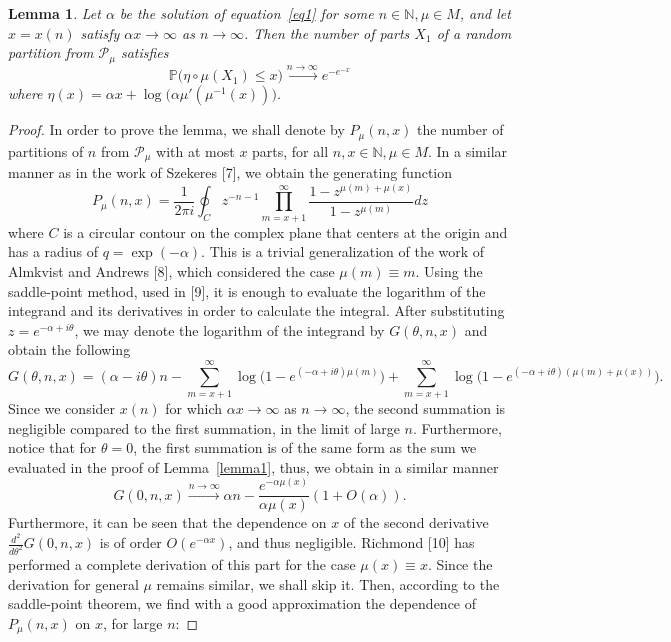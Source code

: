 \documentclass[pdflatex,sn-mathphys-num]{sn-jnl}%
\theoremstyle{thmstyleone}%
\theoremstyle{thmstyletwo}%
\theoremstyle{thmstylethree}%
\theoremstyle{thmstylethree}%
\newtheorem{lemma}{Lemma}%
\theoremstyle{thmstylethree}%
\begin{document}
\begin{lemma}\label{lemma2}
    Let $\alpha$ be the solution of equation~\eqref{eq1} for some $n\in\mathbb{N},\mu\in M$, and let $x=x(n)$ satisfy $\alpha x\to\infty$ as $n\to\infty$. Then the number of parts $X_1$ of a random partition from $\mathcal{P}_\mu$ satisfies
    \begin{equation}\label{eq3}
        \mathbb{P}(\eta\circ\mu(X_1)\le x\big)\xrightarrow{n\to\infty}e^{-e^{-x}}
    \end{equation}
    where $\eta(x)=\alpha x+\log\big(\alpha\mu'(\mu^{-1}(x))\big)$.
\end{lemma}
\begin{proof}
    In order to prove the lemma, we shall denote by $P_\mu(n,x)$ the number of partitions of $n$ from $\mathcal{P}_\mu$ with at most $x$ parts, for all $n,x\in\mathbb{N}, \mu\in M$. In a similar manner as in the work of Szekeres [7], we obtain the generating function
    \begin{equation}\label{eq4}
        P_\mu(n,x)=\frac{1}{2\pi i}\oint_Cz^{-n-1}\prod_{m=x+1}^\infty\frac{1-z^{\mu(m)+\mu(x)}}{1-z^{\mu(m)}}dz
    \end{equation}
    where $C$ is a circular contour on the complex plane that centers at the origin and has a radius of $q=\exp(-\alpha)$. This is a trivial generalization of the work of Almkvist and Andrews [8], which considered the case $\mu(m)\equiv m$. Using the saddle-point method, used in [9], it is enough to evaluate the logarithm of the integrand and its derivatives in order to calculate the integral. After substituting $z=e^{-\alpha+i\theta}$, we may denote the logarithm of the integrand by $G(\theta,n,x)$ and obtain the following
\begin{equation*}
    G(\theta,n,x)=(\alpha-i\theta)n-\sum_{m=x+1}^\infty\log\Big(1-e^{(-\alpha+i\theta) \mu(m)}\Big)+\sum_{m=x+1}^\infty\log\Big(1-e^{(-\alpha+i\theta)(\mu(m)+\mu(x))}\Big).
\end{equation*}
Since we consider $x(n)$ for which $\alpha x\to\infty$ as $n\to\infty$, the second summation is negligible compared to the first summation, in the limit of large $n$. Furthermore, notice that for $\theta=0$, the first summation is of the same form as the sum we evaluated in the proof of Lemma~\ref{lemma1}, thus, we obtain in a similar manner
\begin{equation*}
    G(0,n,x)\xrightarrow{n\to\infty}\alpha n - \frac{e^{-\alpha\mu(x)}}{\alpha\mu(x)}(1+O(\alpha)).
\end{equation*}
Furthermore, it can be seen that the dependence on $x$ of the second derivative $\frac{d^2}{d\theta^2}G(0,n,x)$ is of order $O(e^{-\alpha x})$, and thus negligible. Richmond [10] has performed a complete derivation of this part for the case $\mu(x)\equiv x$. Since the derivation for general $\mu$ remains similar, we shall skip it. Then, according to the saddle-point theorem, we find with a good approximation the dependence of $P_\mu(n,x)$ on $x$, for large $n$:

\end{proof}
\end{document}
